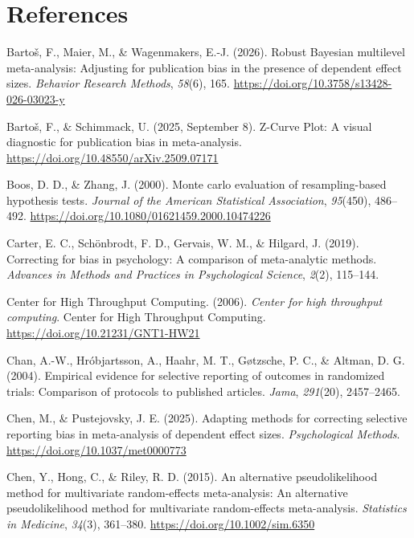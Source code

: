 \documentclass[
  american,
  man, donotrepeattitle,floatsintext]{apa7}
\newlength{\cslhangindent}
\newenvironment{CSLReferences}[2] %
 {\begin{list}{}{%
  \setlength{\itemindent}{0pt}
  \setlength{\leftmargin}{0pt}
  \setlength{\parsep}{0pt}
  \ifodd #1
   \setlength{\leftmargin}{\cslhangindent}
   \setlength{\itemindent}{-1\cslhangindent}
  \fi
  \setlength{\itemsep}{#2\baselineskip}}}
 {\end{list}}
\begin{document}
\section*{References}\label{references}

\begingroup

\protect{}\label{refs}
\begin{CSLReferences}{1}{0}
Bartoš, F., Maier, M., \& Wagenmakers, E.-J. (2026). Robust {Bayesian} multilevel meta-analysis: Adjusting for publication bias in the presence of dependent effect sizes. \emph{Behavior Research Methods}, \emph{58}(6), 165. \url{https://doi.org/10.3758/s13428-026-03023-y}

Bartoš, F., \& Schimmack, U. (2025, September 8). Z-{Curve Plot}: A visual diagnostic for publication bias in meta-analysis. \url{https://doi.org/10.48550/arXiv.2509.07171}

Boos, D. D., \& Zhang, J. (2000). Monte carlo evaluation of resampling-based hypothesis tests. \emph{Journal of the American Statistical Association}, \emph{95}(450), 486--492. \url{https://doi.org/10.1080/01621459.2000.10474226}

Carter, E. C., Schönbrodt, F. D., Gervais, W. M., \& Hilgard, J. (2019). Correcting for bias in psychology: A comparison of meta-analytic methods. \emph{Advances in Methods and Practices in Psychological Science}, \emph{2}(2), 115--144.

Center for High Throughput Computing. (2006). \emph{Center for high throughput computing}. Center for High Throughput Computing. \url{https://doi.org/10.21231/GNT1-HW21}

Chan, A.-W., Hróbjartsson, A., Haahr, M. T., Gøtzsche, P. C., \& Altman, D. G. (2004). Empirical evidence for selective reporting of outcomes in randomized trials: Comparison of protocols to published articles. \emph{Jama}, \emph{291}(20), 2457--2465.

Chen, M., \& Pustejovsky, J. E. (2025). Adapting methods for correcting selective reporting bias in meta-analysis of dependent effect sizes. \emph{Psychological Methods}. \url{https://doi.org/10.1037/met0000773}

Chen, Y., Hong, C., \& Riley, R. D. (2015). An alternative pseudolikelihood method for multivariate random-effects meta-analysis: {An} alternative pseudolikelihood method for multivariate random-effects meta-analysis. \emph{Statistics in Medicine}, \emph{34}(3), 361--380. \url{https://doi.org/10.1002/sim.6350}


\end{CSLReferences}
\end{document}
